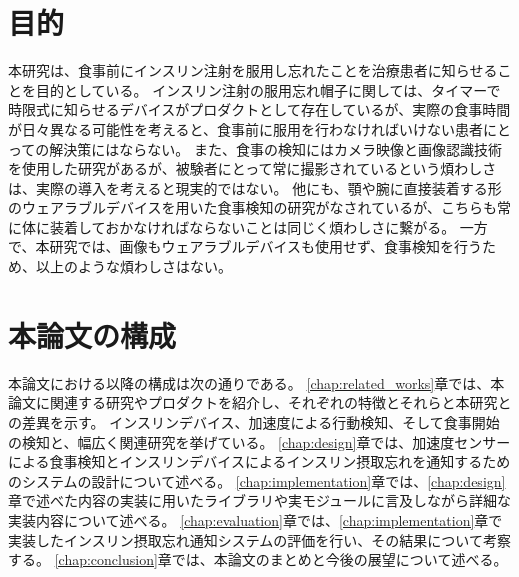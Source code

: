 \section{目的}
\label{section:purpose}

本研究は、食事前にインスリン注射を服用し忘れたことを治療患者に知らせることを目的としている。
インスリン注射の服用忘れ帽子に関しては、タイマーで時限式に知らせるデバイスがプロダクトとして存在しているが、実際の食事時間が日々異なる可能性を考えると、食事前に服用を行わなければいけない患者にとっての解決策にはならない。
また、食事の検知にはカメラ映像と画像認識技術を使用した研究があるが、被験者にとって常に撮影されているという煩わしさは、実際の導入を考えると現実的ではない。
他にも、顎や腕に直接装着する形のウェアラブルデバイスを用いた食事検知の研究がなされているが、こちらも常に体に装着しておかなければならないことは同じく煩わしさに繋がる。
一方で、本研究では、画像もウェアラブルデバイスも使用せず、食事検知を行うため、以上のような煩わしさはない。

\section{本論文の構成}
\label{section:structure}
本論文における以降の構成は次の通りである。
\ref{chap:related_works}章では、本論文に関連する研究やプロダクトを紹介し、それぞれの特徴とそれらと本研究との差異を示す。
インスリンデバイス、加速度による行動検知、そして食事開始の検知と、幅広く関連研究を挙げている。
\ref{chap:design}章では、加速度センサーによる食事検知とインスリンデバイスによるインスリン摂取忘れを通知するためのシステムの設計について述べる。
\ref{chap:implementation}章では、\ref{chap:design}章で述べた内容の実装に用いたライブラリや実モジュールに言及しながら詳細な実装内容について述べる。
\ref{chap:evaluation}章では、\ref{chap:implementation}章で実装したインスリン摂取忘れ通知システムの評価を行い、その結果について考察する。
\ref{chap:conclusion}章では、本論文のまとめと今後の展望について述べる。
